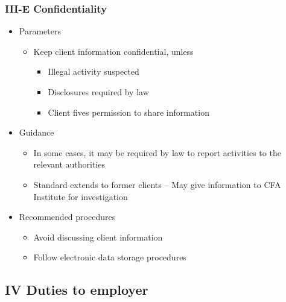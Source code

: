 \documentclass[../notes_compiled.tex]{subfiles}
\begin{document}
\subsubsection{III-E Confidentiality}
\begin{itemize}
\item Parameters
\begin{itemize}
\item Keep client information confidential, unless
\begin{itemize}
\item Illegal activity suspected
\item Disclosures required by law
\item Client fives permission to share information
\end{itemize}
\end{itemize}
\item Guidance
\begin{itemize}
\item In some cases, it may be required by law to report activities to the relevant authorities
\item Standard extends to former clients -- May give information to CFA Institute for investigation
\end{itemize}
\item Recommended procedures
\begin{itemize}
\item Avoid discussing client information
\item Follow electronic data storage procedures
\end{itemize}
\end{itemize}
\subsection{IV Duties to employer}
\end{document}
